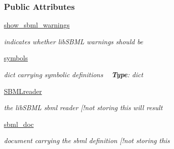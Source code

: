 \subsubsection*{Public Attributes}
\begin{DoxyCompactItemize}
\item 
\mbox{\label{classamici_1_1sbml__import_1_1_sbml_importer_a798e19e1d0ead16356000846afa1c4e0}} 
\mbox{\hyperlink{classamici_1_1sbml__import_1_1_sbml_importer_a798e19e1d0ead16356000846afa1c4e0}{show\+\_\+sbml\+\_\+warnings}}
\begin{DoxyCompactList}\small\item\em indicates whether lib\+S\+B\+ML warnings should be \end{DoxyCompactList}\item 
\mbox{\label{classamici_1_1sbml__import_1_1_sbml_importer_a591fb19f856c8faff2c302734ad80cc0}} 
\mbox{\hyperlink{classamici_1_1sbml__import_1_1_sbml_importer_a591fb19f856c8faff2c302734ad80cc0}{symbols}}
\begin{DoxyCompactList}\small\item\em dict carrying symbolic definitions ~\newline
{\bfseries{Type}}\+: dict \end{DoxyCompactList}\item 
\mbox{\label{classamici_1_1sbml__import_1_1_sbml_importer_a41c7300c6ec425f5b69356e0273cfac3}} 
\mbox{\hyperlink{classamici_1_1sbml__import_1_1_sbml_importer_a41c7300c6ec425f5b69356e0273cfac3}{S\+B\+M\+Lreader}}
\begin{DoxyCompactList}\small\item\em the lib\+S\+B\+ML sbml reader \mbox{[}!not storing this will result \end{DoxyCompactList}\item 
\mbox{\label{classamici_1_1sbml__import_1_1_sbml_importer_a9526d93eea89065515a47d67fe8936de}} 
\mbox{\hyperlink{classamici_1_1sbml__import_1_1_sbml_importer_a9526d93eea89065515a47d67fe8936de}{sbml\+\_\+doc}}
\begin{DoxyCompactList}\small\item\em document carrying the sbml definition \mbox{[}!not storing this \end{DoxyCompactList}\item 

\end{DoxyCompactItemize}
